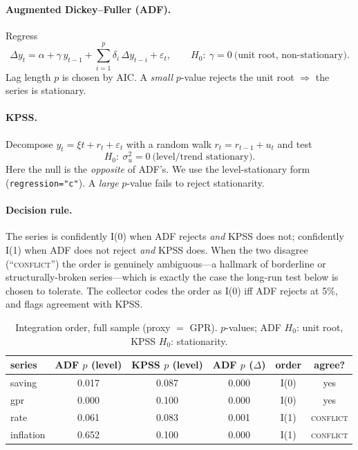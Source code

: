 \documentclass[11pt,a4paper]{article}
\newcommand{\code}[1]{\texttt{#1}}
\begin{document}
\paragraph{Augmented Dickey--Fuller (ADF).} Regress
\begin{equation}
  \Delta y_t = \alpha + \gamma\,y_{t-1}
             + \sum_{i=1}^{p}\delta_i\,\Delta y_{t-i} + \varepsilon_t,
  \qquad H_0:\ \gamma = 0\ \text{(unit root, non-stationary)} .
\end{equation}
Lag length $p$ is chosen by AIC. A \emph{small} $p$-value rejects the unit root
$\Rightarrow$ the series is stationary.

\paragraph{KPSS.} Decompose $y_t = \xi t + r_t + \varepsilon_t$ with a random
walk $r_t = r_{t-1}+u_t$ and test
\begin{equation}
  H_0:\ \sigma^2_u = 0\ \text{(level/trend stationary)} .
\end{equation}
Here the null is the \emph{opposite} of ADF's. We use the level-stationary form
(\code{regression="c"}). A \emph{large} $p$-value fails to reject stationarity.

\paragraph{Decision rule.} The series is confidently I(0) when ADF rejects
\emph{and} KPSS does not; confidently I(1) when ADF does not reject \emph{and}
KPSS does. When the two disagree (``\textsc{conflict}'') the order is genuinely
ambiguous---a hallmark of borderline or structurally-broken series---which is
exactly the case the long-run test below is chosen to tolerate. The collector
codes the order as I(0) iff ADF rejects at 5\%, and flags agreement with KPSS.

\begin{table}[htbp]\centering
\caption{Integration order, full sample (proxy $=$ GPR). $p$-values; ADF $H_0$:
unit root, KPSS $H_0$: stationarity.}
\label{tab:integ}
\renewcommand{\arraystretch}{1.15}
\begin{tabular}{@{}lccccc@{}}
\toprule
series & ADF $p$ (level) & KPSS $p$ (level) & ADF $p$ ($\Delta$) & order & agree? \\
\midrule
saving    & 0.017 & 0.087 & 0.000 & I(0) & yes \\
gpr       & 0.000 & 0.100 & 0.000 & I(0) & yes \\
rate      & 0.061 & 0.083 & 0.001 & I(1) & \textsc{conflict} \\
inflation & 0.652 & 0.100 & 0.000 & I(1) & \textsc{conflict} \\
\bottomrule
\end{tabular}
\end{table}
\end{document}
